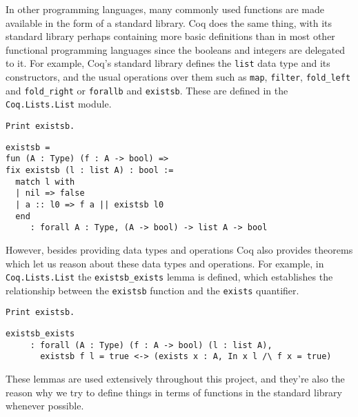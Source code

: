 In other programming languages, many commonly used functions are made available in the form of a
standard library. Coq does the same thing, with its standard library perhaps containing more basic
definitions than in most other functional programming languages since the booleans and integers are
delegated to it. For example, Coq's standard library defines the \texttt{list} data type and
its constructors, and the usual operations over them such as \texttt{map}, 
\texttt{filter}, \texttt{fold_left} and \texttt{fold_right} or
\texttt{forallb} and \texttt{existsb}. These are defined in the
\texttt{Coq.Lists.List} module.

\begin{verbatim}
Print existsb.
\end{verbatim}
\vspace{-\baselineskip*3/2}
\begin{verbatim}
existsb = 
fun (A : Type) (f : A -> bool) =>
fix existsb (l : list A) : bool :=
  match l with
  | nil => false
  | a :: l0 => f a || existsb l0
  end
     : forall A : Type, (A -> bool) -> list A -> bool
\end{verbatim}


However, besides providing data types and operations Coq also provides theorems which let us reason
about these data types and operations. For example, in \texttt{Coq.Lists.List} the
\texttt{existsb_exists} lemma is defined, which establishes the relationship between the
\texttt{existsb} function and the \texttt{exists} quantifier.

\begin{verbatim}
Print existsb.
\end{verbatim}
\vspace{-\baselineskip*3/2}
\begin{verbatim}
existsb_exists
     : forall (A : Type) (f : A -> bool) (l : list A),
       existsb f l = true <-> (exists x : A, In x l /\ f x = true)
\end{verbatim}

These lemmas are used extensively throughout this project, and they're also the reason why we try to
define things in terms of functions in the standard library whenever possible.